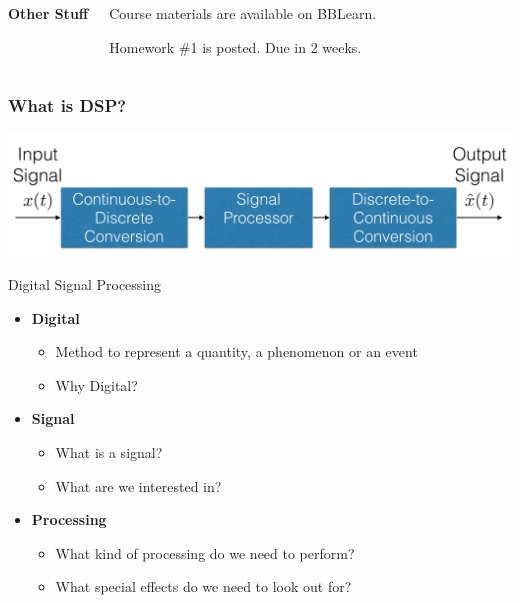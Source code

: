 \documentclass[mathserif,9pt,handout]{beamer}
\begin{document}
\begin{frame}
\begin{columns}
    {\bf\color{blue!50!black}Other Stuff}
    \begin{mitemize}
      \item Course materials are available on BBLearn.  
      \item Homework \#1 is posted. Due in 2 weeks. 
    \end{mitemize}
    \vspace{1em}
  \end{columns}
\end{frame}



\begin{frame}\frametitle{What is DSP?}\small
  \begin{center}
    \includegraphics[width=.9\textwidth]{dsp_flow.pdf}
  \end{center}
  \begin{exampleblock}{\small Digital Signal Processing}
  \begin{itemize}
    \item {\bf\color{green!50!black}Digital} 
      \begin{itemize}
        \item Method to represent a quantity, a phenomenon or an event
        \item Why Digital?
      \end{itemize}
    \item {\bf\color{green!50!black}Signal}
      \begin{itemize}
        \item What is a signal?
        \item What are we interested in?
      \end{itemize}
    \item {\bf\color{green!50!black}Processing}
      \begin{itemize}
        \item What kind of processing do we need to perform?
        \item What special effects do we need to look out for?
      \end{itemize}
  \end{itemize}
  \end{exampleblock}
\end{frame}
\end{document}
